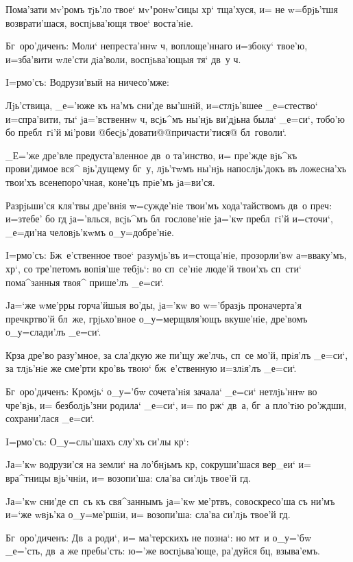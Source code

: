 Пома'зати мv'ромъ тjь'ло твое` мv"ронw'сицы хр` 
тща'хуся, и= не w=брjь'тшя возврати'шася, воспjьва'ющя 
твое` воста'нiе.

Бг~оро'диченъ: Моли` непреста'ннw ч, 
воплоще'ннаго и=з\ъ боку` твое'ю, и=зба'вити w\т ле'сти 
дiа'воли, воспjьва'ющыя тя` дв~у ч. 

 I=рмо'съ: Водрузи'вый на ничесо'мже:

Лjь'ствица, _е='юже къ на'мъ сни'де вы'шнiй, 
и=стлjь'вшее _е=стество` и=спра'вити, ты` jа='вственнw 
ч, всjь^мъ ны'нjь ви'дjьна была` _е=си`, тобо'ю бо 
пребл~гi'й мi'рови @бесjь'довати@{@причасти'тися@} 
бл~говоли`.

_Е='же дре'вле предуста'вленное дв~о та'инство, и= 
пре'жде вjь^къ прови'димое вся^ вjь'дущему бг~у, лjь'тwмъ 
ны'нjь напослjь'докъ въ ложесна'хъ твои'хъ 
всенепоро'чная, коне'цъ прiе'мъ jа=ви'ся.

Разрjьши'ся кля'твы дре'внiя w=сужде'нiе твои'мъ 
хода'тайствомъ дв~о преч: и=з\ъ тебе' бо гд 
jа='влься, всjь^мъ бл~гослове'нiе jа='кw пребл~гi'й 
и=сточи`, _е=ди'на человjь'кwмъ о_у=добре'нiе.


I=рмо'съ: Бж~е'ственное твое` разумjь'въ и=стоща'нiе, 
прозорли'вw а=вваку'мъ, хр`, со тре'петомъ вопiя'ше 
тебjь`: во сп~се'нiе люде'й твои'хъ сп~сти` пома^занныя 
твоя^ прише'лъ _е=си`.

Jа=`же w\т ме'рры горча'йшыя во'ды, jа='кw во 
w='бразjь проначерта'я преч кр тво'й бл~же, 
грjьхо'вное о_у=мерщвля'ющъ вкуше'нiе, дре'вомъ 
о_у=слади'лъ _е=си`.

Кр за дре'во разу'мное, за сла'дкую же пи'щу 
же'лчь, сп~се мо'й, прiя'лъ _е=си`, за тлjь'нiе же 
сме'рти кро'вь твою` бж~е'ственную и=злiя'лъ _е=си`.

Бг~оро'диченъ: Кромjь` о_у='бw сочета'нiя зачала` 
_е=си` нетлjь'ннw во чре'вjь, и= без\ъ болjь'зни родила` 
_е=си`, и= по рж` дв~а, бг~а пло'тiю ро'ждши, 
сохрани'лася _е=си`. 

 I=рмо'съ: О_у=слы'шахъ слу'хъ си'лы кр`:

Jа='кw водрузи'ся на земли` на ло'бнjьмъ кр, 
сокруши'шася вер_еи` и= вра^тницы вjь'чнiи, и= возопи'ша: 
сла'ва си'лjь твое'й гд.

Jа='кw сни'де сп~съ къ свя^заннымъ jа='кw ме'ртвъ, 
совоскресо'ша съ ни'мъ и=`же w\т вjь'ка о_у=ме'ршiи, и= 
возопи'ша: сла'ва си'лjь твое'й гд.

Бг~оро'диченъ: Дв~а роди`, и= ма'терскихъ не позна`: 
но мт~и о_у='бw _е='сть, дв~а же пребы'сть: ю='же 
воспjьва'юще, ра'дуйся бц, взыва'емъ.

